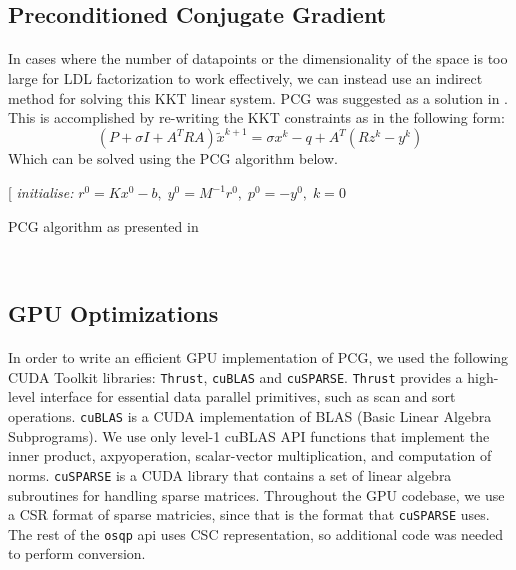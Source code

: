 \documentclass[justified,nobib]{tufte-handout}
\begin{document}
\begin{fullwidth}
\subsection{Preconditioned Conjugate Gradient}
\paragraph{}
In cases where the number of datapoints or the dimensionality of the space is too large for LDL factorization to work effectively, we can instead use an indirect method for solving this KKT linear system. PCG was suggested as a solution in \cite{cuosqp}. This is accomplished by re-writing the KKT constraints as in the following form:
\begin{equation}
(P + \sigma I + A^TRA)\tilde{x}^{k+1} = \sigma x^k - q + A^T(Rz^k-y^k)
\end{equation}
Which can be solved using the PCG algorithm below. 
\begin{algorithm}[htp][
\SetAlgoLined
\textit{initialise:}
 $r^0 = Kx^0 -b, \; y^0 = M^{-1}r^0, \; p^0 = -y^0, \; k = 0 $
 \\  \caption{PCG algorithm as presented in \cite{cuosqp}}
\end{algorithm}\\

\subsection{GPU Optimizations}
\paragraph{}
In order to write an efficient GPU implementation of PCG, we used the following CUDA Toolkit libraries: \texttt{Thrust}, \texttt{cuBLAS} and \texttt{cuSPARSE}. \texttt{Thrust} provides a high-level interface for essential data parallel primitives, such as scan and sort operations. \texttt{cuBLAS} is a CUDA implementation of BLAS (Basic Linear Algebra Subprograms). We use only level-1 cuBLAS API functions that implement the inner product, axpyoperation, scalar-vector multiplication, and computation of norms. \texttt{cuSPARSE} is a CUDA library that contains a set of linear algebra subroutines for handling sparse matrices. Throughout the GPU codebase, we use a CSR format of sparse matricies, since that is the format that \texttt{cuSPARSE} uses. The rest of the \texttt{osqp} api uses CSC representation, so additional code was needed to perform conversion. 

\end{fullwidth}
\end{document}
